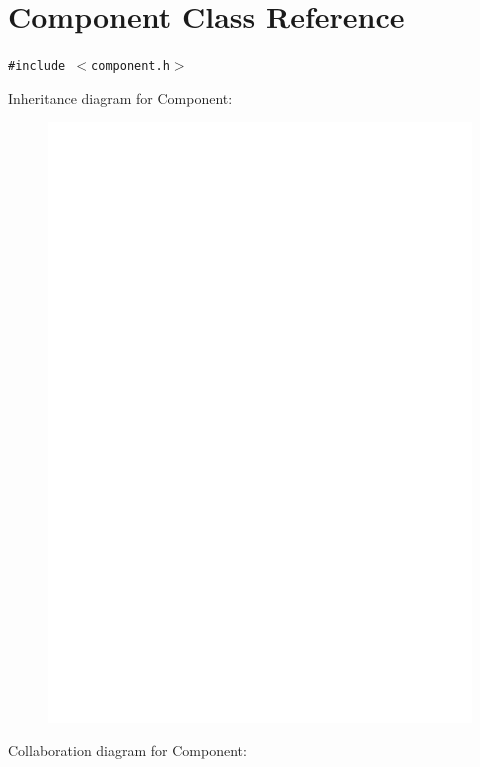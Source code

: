 \section{Component Class Reference}
\label{classComponent}
{\tt \#include $<$component.h$>$}

Inheritance diagram for Component:\nopagebreak
\begin{figure}[H]
\begin{center}
\leavevmode
\includegraphics[width=400pt]{classComponent__inherit__graph}
\end{center}
\end{figure}
Collaboration diagram for Component:\nopagebreak
